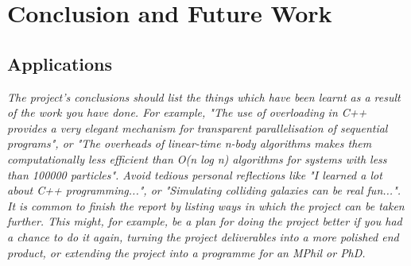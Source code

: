
\chapter{Conclusion and Future Work}

\label{ch:conclusions}

\section{Applications}


\emph{The project's conclusions should list the things which have been learnt as a result of the work you have done. For example, "The use of overloading in C++ provides a very elegant mechanism for transparent parallelisation of sequential programs", or "The overheads of linear-time n-body algorithms makes them computationally less efficient than O(n log n) algorithms for systems with less than 100000 particles". Avoid tedious personal reflections like "I learned a lot about C++ programming...", or "Simulating colliding galaxies can be real fun...". It is common to finish the report by listing ways in which the project can be taken further. This might, for example, be a plan for doing the project better if you had a chance to do it again, turning the project deliverables into a more polished end product, or extending the project into a programme for an MPhil or PhD.}

